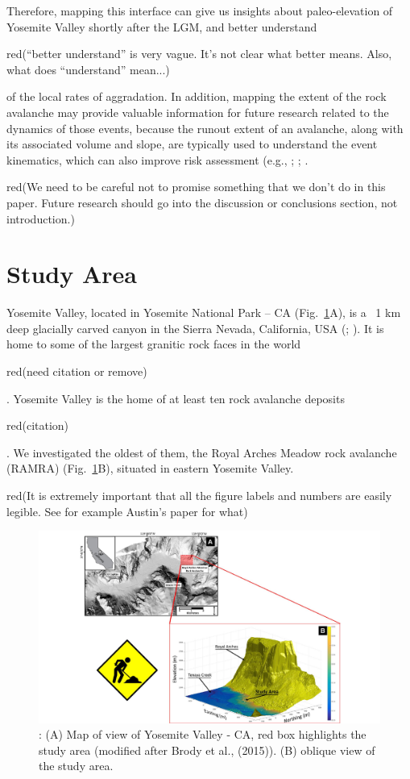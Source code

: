 \documentclass[5p]{elsarticle}
\newcommand{\alon}{\begin{color}{red}}
\newcommand{\aloff}{\end{color}}
\begin{document}
Therefore, mapping this interface can give us insights about paleo-elevation of Yosemite Valley shortly after the LGM, and better understand \alon (``better understand'' is very vague. It's not clear what better means. Also, what does ``understand'' mean...) \aloff of the local rates of aggradation. In addition, mapping the extent of the rock avalanche may provide valuable information for future research related to the dynamics of those events, because the runout extent of an avalanche, along with its associated volume and slope, are typically used to understand the event kinematics, which can also improve risk assessment (e.g., \cite{wieczorek1998rockfall}; \cite{guzzetti2003rockfall}; \cite{stock2014quantitative}. \alon (We need to be careful not to promise something that we don't do in this paper. Future research should go into the discussion or conclusions section, not introduction.) \aloff





\section{Study Area}

Yosemite Valley, located in Yosemite National Park -- CA (Fig.~\ref{Study_Area}A), is a ~1  km deep glacially carved canyon in the Sierra Nevada, California, USA (\cite{matthes1930geologic}; \cite{huber1987geologic}). It is home to some of the largest granitic rock faces in the world \alon (need citation or remove)\aloff. Yosemite Valley is the home of at least ten rock avalanche deposits \alon(citation)\aloff. We investigated the oldest of them, the Royal Arches Meadow rock avalanche (RAMRA) (Fig.~\ref{Study_Area}B), situated in eastern Yosemite Valley. \alon(It is extremely important that all the figure labels and numbers are easily legible. See for example Austin's paper for what)\aloff

									\begin{figure}[h]

	\includegraphics[width=\textwidth]{Figures/Study_Area.pdf}
		\caption{: (A) Map of view of Yosemite Valley - CA, red box highlights the study area (modified after Brody et al., (2015)). (B) oblique view of the study area.  \label{Study_Area}}


									\end{figure}
\end{document}
